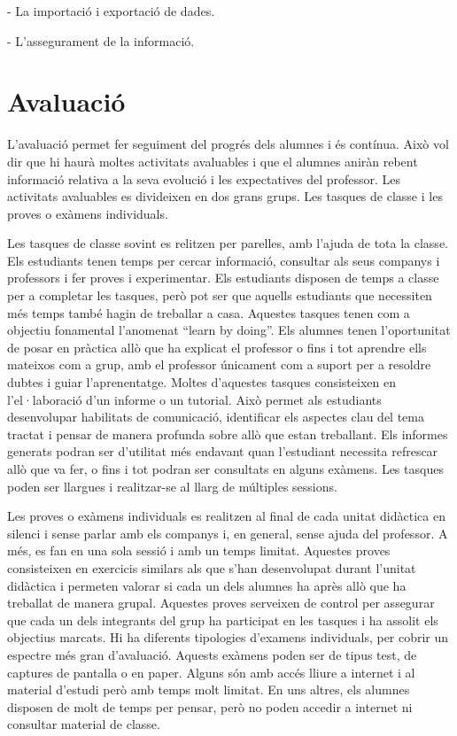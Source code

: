 \documentclass[catalan, a4paper, 12pt, titlepage]{article}
\begin{document}
- La importació i exportació de dades.

- L'assegurament de la informació.

\section{Avaluació}

L'avaluació permet fer seguiment del progrés dels alumnes i és contínua.
Això vol dir que hi haurà moltes activitats avaluables i que el alumnes aniràn rebent informació relativa a la seva evolució i les expectatives del professor.
Les activitats avaluables es divideixen en dos grans grups. 
Les tasques de classe i les proves o exàmens individuals.

Les tasques de classe sovint es relitzen per parelles, amb l'ajuda de tota la classe.
Els estudiants tenen temps per cercar informació, consultar als seus companys i professors i fer proves i experimentar. 
Els estudiants disposen de temps a classe per a completar les tasques, però pot ser que aquells estudiants que necessiten més temps també hagin de treballar a casa.
Aquestes tasques tenen com a objectiu fonamental l'anomenat ``learn by doing''.
Els alumnes tenen l'oportunitat de posar en pràctica allò que ha explicat el professor o fins i tot aprendre ells mateixos com a grup, amb el professor únicament com a suport per a resoldre dubtes i guiar l'aprenentatge.
Moltes d'aquestes tasques consisteixen en l'el·laboració d'un informe o un tutorial.
Això permet als estudiants desenvolupar habilitats de comunicació, identificar els aspectes clau del tema tractat i pensar de manera profunda sobre allò que estan treballant. Els informes generats podran ser d'utilitat més endavant quan l'estudiant necessita refrescar allò que va fer, o fins i tot podran ser consultats en alguns exàmens.
Les tasques poden ser llargues i realitzar-se al llarg de múltiples sessions.

Les proves o exàmens individuals es realitzen al final de cada unitat didàctica en silenci i sense parlar amb els companys i, en general, sense ajuda del professor.
A més, es fan en una sola sessió i amb un temps limitat.
Aquestes proves consisteixen en exercicis similars als que s'han desenvolupat durant l'unitat didàctica i permeten valorar si cada un dels alumnes ha après allò que ha treballat de manera grupal.
Aquestes proves serveixen de control per assegurar que cada un dels integrants del grup ha participat en les tasques i ha assolit els objectius marcats.
Hi ha diferents tipologies d'examens individuals, per cobrir un espectre més gran d'avaluació. Aquests exàmens poden ser de tipus test, de captures de pantalla o en paper. 
Alguns són amb accés lliure a internet i al material d'estudi però amb temps molt limitat.
En uns altres, els alumnes disposen de molt de temps per pensar, però no poden accedir a internet ni consultar material de classe.
\end{document}
